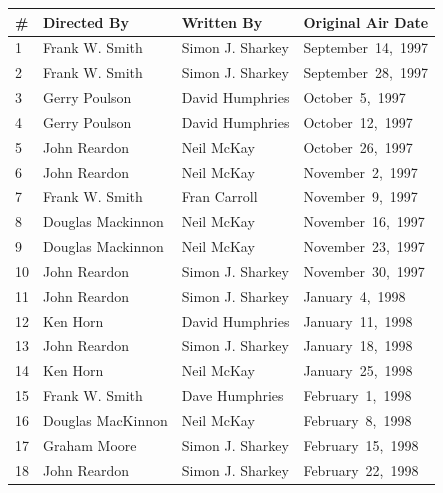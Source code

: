 \documentclass{article}
\begin{document}
\begin{tabular}{llll}
\toprule
\# & Directed By & Written By & Original Air Date \\
\midrule
1 & Frank W. Smith & Simon J. Sharkey & September 14, 1997 \\
2 & Frank W. Smith & Simon J. Sharkey & September 28, 1997 \\
3 & Gerry Poulson & David Humphries & October 5, 1997 \\
4 & Gerry Poulson & David Humphries & October 12, 1997 \\
5 & John Reardon & Neil McKay & October 26, 1997 \\
6 & John Reardon & Neil McKay & November 2, 1997 \\
7 & Frank W. Smith & Fran Carroll & November 9, 1997 \\
8 & Douglas Mackinnon & Neil McKay & November 16, 1997 \\
9 & Douglas Mackinnon & Neil McKay & November 23, 1997 \\
10 & John Reardon & Simon J. Sharkey & November 30, 1997 \\
11 & John Reardon & Simon J. Sharkey & January 4, 1998 \\
12 & Ken Horn & David Humphries & January 11, 1998 \\
13 & John Reardon & Simon J. Sharkey & January 18, 1998 \\
14 & Ken Horn & Neil McKay & January 25, 1998 \\
15 & Frank W. Smith & Dave Humphries & February 1, 1998 \\
16 & Douglas MacKinnon & Neil McKay & February 8, 1998 \\
17 & Graham Moore & Simon J. Sharkey & February 15, 1998 \\
18 & John Reardon & Simon J. Sharkey & February 22, 1998 \\
\bottomrule
\end{tabular}
\end{document}
